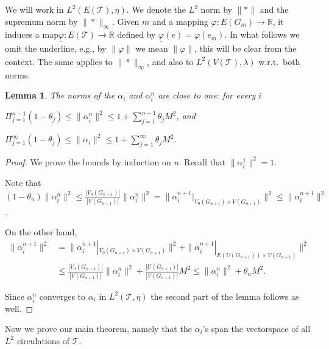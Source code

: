\documentclass[10pt]{article}
\theoremstyle{plain}
\newtheorem{lemma}{Lemma}[section]
\theoremstyle{remark}
\newcommand{\1}{\mathbbm{1}}
\newcommand{\mcT}{\mathcal{T}}
\numberwithin{equation}{section}
\begin{document}
We will work in $L^2(E(\mcT), \eta)$.
We denote the $L^2$ norm by $\|*\|$ and the supremum norm by $\|*\|_{\infty}$. Given $m$ and a mapping $\varphi:E(G_m) \to \mathbb{R}$, it induces a map$\underline{\varphi}: E(\mcT) \to \mathbb{R}$ defined by $\underline{\varphi}(e)=\varphi(e_m)$. In what follows we omit the underline, e.g., by $\|\varphi\|$ we mean $\|\underline{\varphi}\|$, this will be clear from the context. The same applies to $\|*\|_{\infty}$, and also to $L^2(V(\mcT),\lambda)$ w.r.t.\ both norms. 

\begin{lemma} \label{lemma:alpha_norms}
The norms of the $\alpha_i$ and $\alpha^n_i$ are close to one: for every $i$

$\Pi_{j=1}^{n-1} (1-\theta_j) \leq \|\alpha_i^n\|^2 \leq 1+ \sum_{j=1}^{n-1} \theta_j M^2$, and

$\Pi_{j=1}^{\infty} (1-\theta_j) \leq \|\alpha_i\|^2 \leq 1 + \sum_{j=1}^{\infty} \theta_jM^2$.
\end{lemma}

\begin{proof} We prove the bounds by induction on $n$. Recall that $\|\alpha^1_i\|^2=1$.

Note that $(1-\theta_n) \|\alpha_i^n\|^2 \leq \frac{|V_0(G_{n+1})|}{|V(G_{n+1})|} \|\alpha_i^n\|^2 = \|\alpha_i^{n+1}|_{V_0(G_{n+1}) \times V(G_{n+1})}\|^2 \leq \|\alpha_i^{n+1}\|^2$. 

On the other hand, 
\begin{align*}
    \|\alpha_i^{n+1}\|^2 &= \|\alpha_i^{n+1}|_{V_0(G_{n+1}) \times V(G_{n+1})}\|^2 + \|\alpha_i^{n+1}|_{E(U(G_{n+1})) \times V(G_{n+1})}\|^2 \\[6pt] &\leq \frac{|V_0(G_{n+1})|}{|V(G_{n+1})|}\|\alpha_i^n\|^2 + \frac{|U(G_{n+1})|}{|V(G_{n+1})|} M^2 
\leq \|\alpha_i^n\|^2 + \theta_n M^2.
\end{align*}

Since $\alpha_i^n$ converges to $\alpha_i$ in $L^2(\mcT, \eta)$ the second part of the lemma follows as well.
\end{proof}

Now we prove our main theorem, namely that the $\alpha_i$'s span the vectorspace of all $L^2$ circulations of $\mcT$.
\end{document}
